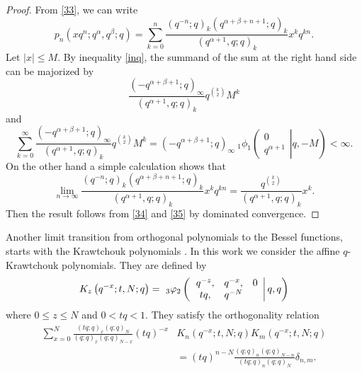 \documentclass[12pt,a4paper]{amsart}
\numberwithin{equation}{section}
\theoremstyle{plain}
\theoremstyle{definition}
\theoremstyle{remark}
\numberwithin{equation}{section}
\numberwithin{table}{section}
\numberwithin{figure}{section}
\begin{document}
\begin{proof} From \eqref{33}, we can write
\begin{equation}
p_n(xq^n;q^{\alpha},q^{\beta};q)=\sum_{k=0}^{n}\frac{(q^{-n};q)_k(q^{\alpha+\beta
+n+1};q)_k}{(q^{\alpha+1},q;q)_k}x^kq^{kn}.
\end{equation}
Let $|x|\leq M$. By inequality \eqref{inq}, the summand of the
sum at the right hand side can be majorized by
\begin{equation*}
\frac{(-q^{\alpha+\beta+1};q)_{\infty}}{(q^{\alpha+1},q;q)_k} q^{\binom{k}{2}}M^k
\end{equation*}
and
\begin{equation}
\sum_{k=0}^{\infty}\frac{(-q^{\alpha+\beta+1};q)_{\infty}}{(q^{\alpha+1},q;q)_k} q^{\binom{k}{2}}M^k=(-q^{\alpha+\beta+1};q)_{\infty}
\ _{1}\phi_1\left( \left.\begin{matrix} 0\\
q^{\alpha+1}\end{matrix}\right\vert q,-M\right)<\infty \label{34}.
\end{equation}
On the other hand a simple calculation shows that
\begin{equation}
\lim_{n\rightarrow\infty}\frac{(q^{-n};q)_k(q^{\alpha+\beta
+n+1};q)_k}{(q^{\alpha+1},q;q)_k}x^kq^{kn}=\frac{q^{\binom{k}{2}}}{(q^{\alpha+1},q;q)_k}x^k \label{35}.
\end{equation}
Then the result follows from \eqref{34} and \eqref{35} by dominated
convergence.
\end{proof}
Another limit transition from orthogonal polynomials to the Bessel
functions, starts with the Krawtchouk polynomials \cite{KoS}. In
this work we consider the affine $q$-Krawtchouk polynomials. They are defined by \cite{Sheme}
\begin{equation}K_{z}\left(
q^{-x};t,N;q\right)= \ _{3}\varphi_{ 2}\left(  \left.
\begin{array}
[c]{ccc}q^{-z}, & q^{-x}, & 0\\
tq, & q^{-N} &
\end{array}
\right\vert q,q\right)
\end{equation}
where $0\leq z\leq N$ and $0<tq<1$. They satisfy the orthogonality
relation
\begin{align}
\sum_{x=0}^{N}\frac{(tq;q)_x(q;q)_N}{(q;q)_x(q;q)_{N-x}}(tq)^{-x}&K_{n}\left(
q^{-x};t,N;q\right)K_{m}\left(
q^{-x};t,N;q\right)\\&=(tq)^{n-N}\frac{(q;q)_n(q;q)_{N-n}}{(tq;q)_n(q;q)_{N}}\delta_{n,m}.
\end{align}
\end{document}
